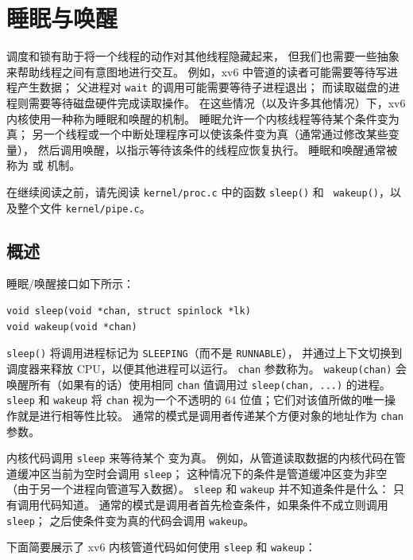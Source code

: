 \chapter{睡眠与唤醒}
\label{CH:SLEEP}

调度和锁有助于将一个线程的动作对其他线程隐藏起来，
但我们也需要一些抽象来帮助线程之间有意图地进行交互。
例如，xv6 中管道的读者可能需要等待写进程产生数据；
父进程对 \lstinline{wait} 的调用可能需要等待子进程退出；
而读取磁盘的进程则需要等待磁盘硬件完成读取操作。
在这些情况（以及许多其他情况）下，xv6 内核使用一种称为睡眠和唤醒的机制。
睡眠允许一个内核线程等待某个条件变为真；
另一个线程或一个中断处理程序可以使该条件变为真（通常通过修改某些变量），
然后调用唤醒，以指示等待该条件的线程应恢复执行。
睡眠和唤醒通常被称为
或
机制。

在继续阅读之前，请先阅读 {\tt kernel/proc.c} 中的函数 {\tt sleep()} 和 {\tt
  wakeup()}，以及整个文件 {\tt kernel/pipe.c}。

\section{概述}

睡眠/唤醒接口如下所示：

\begin{lstlisting}
void sleep(void *chan, struct spinlock *lk)
void wakeup(void *chan)
\end{lstlisting}

\lstinline{sleep()} 将调用进程标记为 \lstinline{SLEEPING}（而不是 \lstinline{RUNNABLE}），
并通过上下文切换到调度器来释放 CPU，以便其他进程可以运行。
\lstinline{chan} 参数称为。
\lstinline{wakeup(chan)} 会唤醒所有（如果有的话）使用相同 \lstinline{chan}
值调用过 \lstinline{sleep(chan, ...)} 的进程。
\lstinline{sleep} 和 \lstinline{wakeup} 将 \lstinline{chan}
视为一个不透明的 64 位值；它们对该值所做的唯一操作就是进行相等性比较。
通常的模式是调用者传递某个方便对象的地址作为 \lstinline{chan} 参数。

内核代码调用 \lstinline{sleep} 来等待某个
变为真。
例如，从管道读取数据的内核代码在管道缓冲区当前为空时会调用 \lstinline{sleep}；
这种情况下的条件是管道缓冲区变为非空（由于另一个进程向管道写入数据）。
\lstinline{sleep} 和 \lstinline{wakeup} 并不知道条件是什么：
只有调用代码知道。
通常的模式是调用者首先检查条件，如果条件不成立则调用 \lstinline{sleep}；
之后使条件变为真的代码会调用 \lstinline{wakeup}。

下面简要展示了 xv6 内核管道代码如何使用
\lstinline{sleep} 和 \lstinline{wakeup}：

